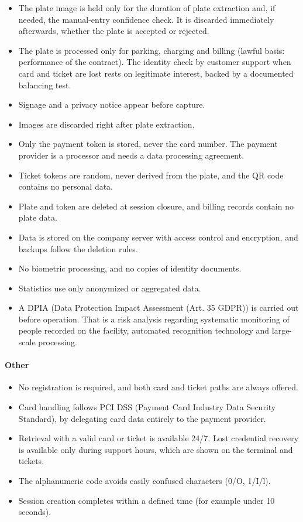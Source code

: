 \documentclass[11pt,a4paper]{article}
\begin{document}
\begin{itemize}
    \item The plate image is held only for the duration of plate extraction
    and, if needed, the manual-entry confidence check. It is
    discarded immediately afterwards, whether the plate is accepted
    or rejected.
    \item The plate is processed only for parking, charging and billing
    (lawful basis: performance of the contract). The identity check
    by customer support when card and ticket are
    lost rests on legitimate interest, backed by a documented balancing
    test.
    \item Signage and a privacy notice appear before capture.
    \item Images are discarded right after plate extraction.
    \item Only the payment token is stored, never the card number. The
    payment provider is a processor and needs a data processing
    agreement.
    \item Ticket tokens are random, never derived from the plate, and the
    QR code contains no personal data.
    \item Plate and token are deleted at session closure, and billing records
    contain no plate data.
    \item Data is stored on the company server with access control and
    encryption, and backups follow the deletion rules.
    \item No biometric processing, and no copies of identity documents.
    \item Statistics use only anonymized or aggregated data.
    \item A DPIA (Data Protection Impact Assessment (Art. 35 GDPR)) is
    carried out before operation. That is a risk analysis regarding
    systematic monitoring of people recorded on the facility,
    automated recognition technology and large-scale processing.
\end{itemize}

\paragraph{Other}

\begin{itemize}
    \item No registration is required, and both card and ticket paths are
    always offered.
    \item Card handling follows PCI DSS (Payment Card Industry Data
    Security Standard), by delegating card data entirely to the
    payment provider.
    \item Retrieval with a valid card or ticket is available 24/7. Lost
    credential recovery is available only during support hours, which
    are shown on the terminal and tickets.
    \item The alphanumeric code avoids easily confused characters (0/O,
    1/I/l).
    \item Session creation completes within a defined time (for example
    under 10 seconds).
\end{itemize}
\end{document}
